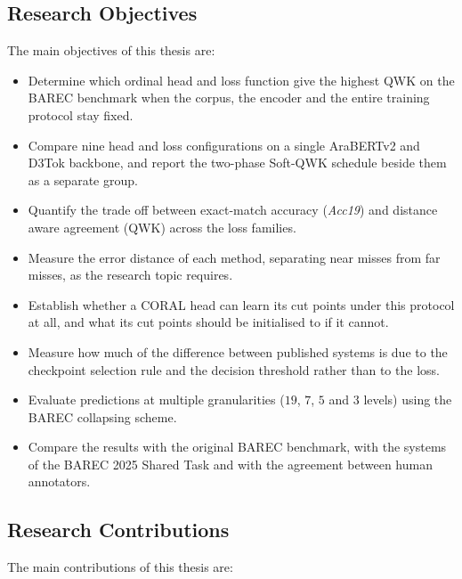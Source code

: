 \documentclass[12pt]{report}
\begin{document}
\subsection{Research Objectives}
The main objectives of this thesis are:
\begin{itemize}

\item Determine which ordinal head and loss function give the highest QWK on the BAREC benchmark when the corpus, the encoder and the entire training protocol stay fixed.
\item Compare nine head and loss configurations on a single AraBERTv2 and D3Tok backbone, and report the two-phase Soft-QWK schedule beside them as a separate group.

\item Quantify the trade off between exact-match accuracy (\textit{Acc19}) and distance aware agreement (QWK) across the loss families.

\item Measure the error distance of each method, separating near misses from far misses, as the research topic requires.

\item Establish whether a CORAL head can learn its cut points under this protocol at all, and what its cut points should be initialised to if it cannot.

\item Measure how much of the difference between published systems is due to the checkpoint selection rule and the decision threshold rather than to the loss.

\item Evaluate predictions at multiple granularities ($19$, $7$, $5$ and $3$ levels) using the BAREC collapsing scheme.

\item Compare the results with the original BAREC benchmark, with the systems of the BAREC 2025 Shared Task and with the agreement between human annotators.

\end{itemize}



\subsection{Research Contributions}
The main contributions of this thesis are:
\end{document}
